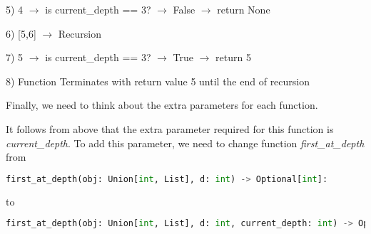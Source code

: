 \documentclass[12pt]{article}
\begin{document}
\begin{enumerate}[a.]
\begin{mdframed}
\begin{mdframed}
\begin{mdframed}
            \hspace{10mm} 5) 4 $\to$ is current\_depth == 3? $\to$ False $\to$ return None

            \hspace{10mm} 6) [5,6] $\to$ Recursion

            \bigskip

            \hspace{10mm} \hspace{10mm} 7) 5 $\to$ is current\_depth == 3? $\to$ True $\to$ return 5

            \bigskip

            8) Function Terminates with return value 5 until the end of recursion

        \end{mdframed}

        \bigskip

        Finally, we need to think about the extra parameters for each function.

        \bigskip

        It follows from above that the extra parameter required for this function is
        \textit{current\_depth}. To add this parameter, we need to change function
        \textit{first\_at\_depth} from

        \begin{lstlisting}[language=python,keepspaces=false]
        first_at_depth(obj: Union[int, List], d: int) -> Optional[int]:
        \end{lstlisting}

        to

        \begin{lstlisting}[language=python,keepspaces=false]
        first_at_depth(obj: Union[int, List], d: int, current_depth: int) -> Optional[int]:
        \end{lstlisting}

        \end{mdframed}
    \end{mdframed}

\end{enumerate}
\end{document}
